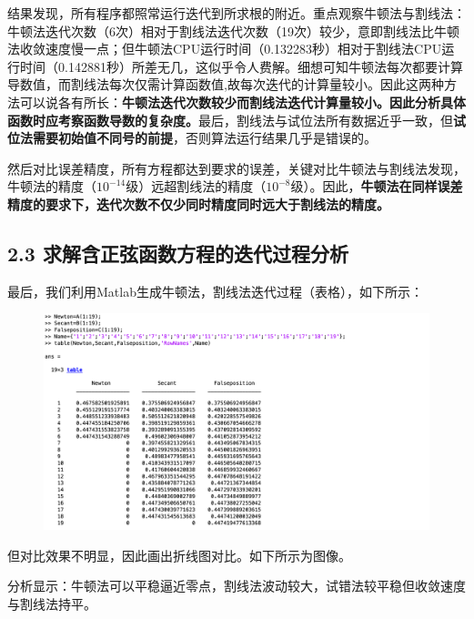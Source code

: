 \documentclass{article}
\begin{document}
    结果发现，所有程序都照常运行迭代到所求根的附近。重点观察牛顿法与割线法：牛顿法迭代次数（6次）相对于割线法迭代次数（19次）较少，意即割线法比牛顿法收敛速度慢一点；但牛顿法CPU运行时间（0.132283秒）相对于割线法CPU运行时间（0.142881秒）所差无几，这似乎令人费解。细想可知牛顿法每次都要计算导数值，而割线法每次仅需计算函数值,故每次迭代的计算量较小。因此这两种方法可以说各有所长：\textbf{牛顿法迭代次数较少而割线法迭代计算量较小。因此分析具体函数时应考察函数导数的复杂度。}最后，割线法与试位法所有数据近乎一致，但\textbf{试位法需要初始值不同号的前提}，否则算法运行结果几乎是错误的。

    然后对比误差精度，所有方程都达到要求的误差，关键对比牛顿法与割线法发现，牛顿法的精度（$10^{-14}$级）远超割线法的精度（$10^{-8}$级）。因此，\textbf{牛顿法在同样误差精度的要求下，迭代次数不仅少同时精度同时远大于割线法的精度。}

\subsection{2.3 求解含正弦函数方程的迭代过程分析}

    最后，我们利用Matlab生成牛顿法，割线法迭代过程（表格），如下所示：
    \begin{figure}[h]
    \centering
    \includegraphics[scale=0.5]{Eq2_NSF_Table.jpg}
    \end{figure}

    但对比效果不明显，因此画出折线图对比。如下所示为图像。

    分析显示：牛顿法可以平稳逼近零点，割线法波动较大，试错法较平稳但收敛速度与割线法持平。
\end{document}
